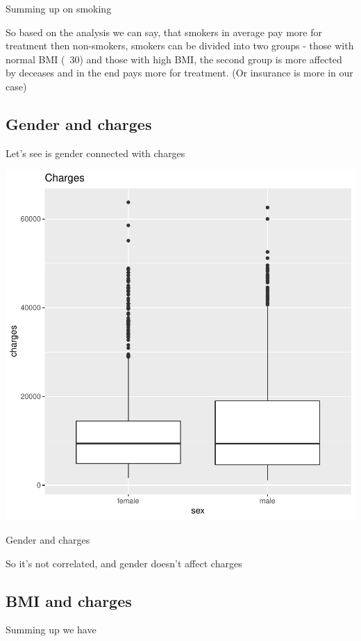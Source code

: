 \documentclass{article}
\begin{document}
Summing up on smoking

So based on the analysis we can say, that smokers in average pay more for treatment
then non-smokers, smokers can be divided into two groups - those with normal BMI (~30)
and those with high BMI, the second group is more affected by deceases and in
the end pays more for treatment. (Or insurance is more in our case)


\subsection{Gender and charges}

Let's see is gender connected with charges

\begin{centerfig}
\includegraphics{Untitled-049}
\caption{Gender and charges}
\end{centerfig}

So it's not correlated, and gender doesn't affect charges

\subsection{BMI and charges}
Summing up we have 
\end{document}
